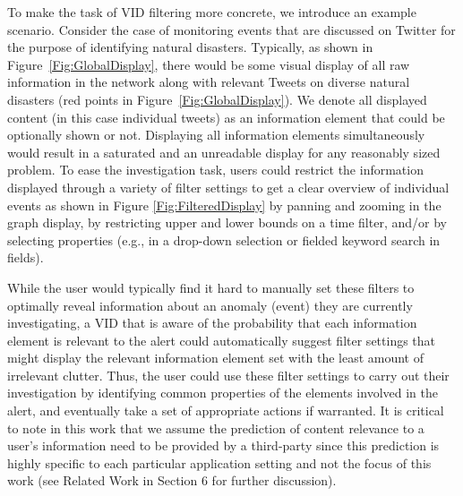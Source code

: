 To make the task of VID filtering more concrete, we introduce an example scenario.
Consider the case of monitoring events that are discussed on Twitter for the purpose of identifying natural disasters. Typically, as shown in Figure~\ref{Fig:GlobalDisplay}, there would be some visual display of all raw information in the network along with relevant Tweets on diverse natural disasters (red points in Figure~\ref{Fig:GlobalDisplay}). We denote all displayed content (in this case individual tweets)
as an information element that could
be optionally shown or not.  Displaying all information elements simultaneously
would result in a saturated and an unreadable display for any reasonably sized 
 problem. To ease the investigation task, users could restrict the information displayed
through a variety of filter settings to get a clear overview of individual events as shown in Figure \ref{Fig:FilteredDisplay} \textendash{} by panning and
zooming in the graph display, by restricting upper and lower bounds
on a time filter, and/or by selecting properties (e.g., in a drop-down
selection or fielded keyword search in fields).%

While the user would typically find it hard to manually set these
filters to optimally reveal information about an anomaly (event) they are
currently investigating, a VID that is aware of the probability that each information element
is relevant to the alert could automatically suggest filter settings
that might display the relevant information element set with the least
amount of irrelevant clutter. Thus, the user could use these filter settings to carry out their investigation by identifying common properties of the elements involved in the alert, and eventually take a set of appropriate actions if warranted.
It is critical to note in this work that we assume the prediction of content relevance to a user's information need 
to be provided by a third-party since this prediction is highly specific
to each particular application setting and not the focus of this work (see Related Work in Section 6 for further discussion). 

